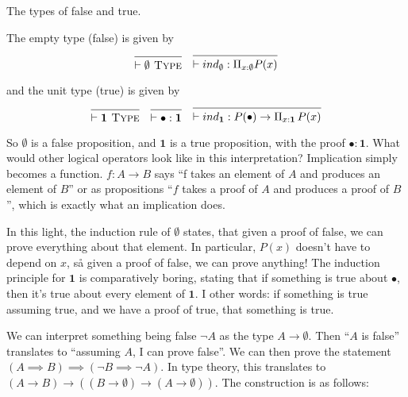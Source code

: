 \documentclass[a4paper, 12pt]{article}
\newcommand{\type}{\textsc{ Type}}
\theoremstyle{changedot}
\theoremstyle{changedotbreak}
\theoremstyle{nonumberplain}
\begin{document}
\begin{definition}
  The types of false and true.

  The empty type (false) is given by
\begin{align*}
  \begin{prooftree}
    \infer0{\vdash \emptyset \type}
  \end{prooftree} & &
  \begin{prooftree}
    \infer0{\vdash ind_{\emptyset} : \Pi_{x:\emptyset} P(x)}
  \end{prooftree}
\end{align*}

and the unit type (true) is given by
\begin{align*}
  \begin{prooftree}
    \infer0{\vdash \mathbf{1} \type}
  \end{prooftree} & &
                    \begin{prooftree}
                      \infer0{\vdash \bullet : \mathbf 1}
                      \end{prooftree}& &
                      \begin{prooftree}
                        \infer0{\vdash ind_{\mathbf 1} : P(\bullet) \to \Pi_{x : \mathbf 1}\, P(x)}
                      \end{prooftree}
  \end{align*}

\end{definition}

So $\emptyset$ is a false proposition, and $\mathbf 1$ is a true proposition, with the proof $\bullet : \mathbf 1$. What would other logical operators look like in this interpretation? Implication simply becomes a function. $f : A \to B$ says ``f takes an element of $A$ and produces an element of $B$'' or as propositions ``$f$ takes a proof of $A$ and produces a proof of $B$'', which is exactly what an implication does.

In this light, the induction rule of $\emptyset$ states, that given a proof of false, we can prove everything about that element. In particular, $P(x)$ doesn't have to depend on $x$, så given a proof of false, we can prove anything! The induction principle for $\mathbf 1$ is comparatively boring, stating that if something is true about $\bullet$, then it's true about every element of $\mathbf 1$. I other words: if something is true assuming true, and we have a proof of true, that something is true.

We can interpret something being false $\neg A$ as the type $A \to \emptyset$. Then ``$A$ is false'' translates to ``assuming $A$, I can prove false''. We can then prove the statement $(A \implies B) \implies (\neg B \implies \neg A)$. In type theory, this translates to $(A \to B) \to ((B \to \emptyset) \to (A \to \emptyset))$. The construction is as follows:
\end{document}
